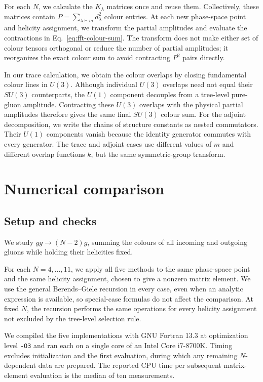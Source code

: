 \documentclass[aps,prd,twocolumn,superscriptaddress,nofootinbib]{revtex4-2}
\begin{document}
For each $N$, we calculate the $K_\lambda$ matrices once and reuse them.
Collectively, these matrices contain
$P=\sum_{\lambda\vdash m}d_\lambda^2$ colour entries.  At each new phase-space
point and helicity assignment, we transform the partial amplitudes and
evaluate the contractions in Eq.~\eqref{eq:fft-colour-sum}.  The transform
does not make either set of colour tensors orthogonal or reduce the number of
partial amplitudes; it reorganizes the exact colour sum to avoid contracting
$P^2$ pairs directly.

In our trace calculation, we obtain the colour overlaps by closing fundamental
colour lines in $U(3)$.  Although individual $U(3)$ overlaps need not equal
their $SU(3)$ counterparts, the $U(1)$ component decouples from a tree-level
pure-gluon amplitude.  Contracting these $U(3)$ overlaps with the physical
partial amplitudes therefore gives the same final $SU(3)$ colour sum.  For the
adjoint decomposition, we write the chains of structure constants as nested
commutators.  Their $U(1)$ components vanish because the identity generator
commutes with every generator.  The trace and adjoint cases use different
values of $m$ and different overlap functions $k$, but the same
symmetric-group transform.

\section{Numerical comparison}
\label{sec:results}



\subsection{Setup and checks}

We study $gg\to(N-2)g$, summing the colours of all incoming and outgoing
gluons while holding their helicities fixed.

For each $N=4,\ldots,11$, we apply all five methods to the same phase-space
point and the same helicity assignment, chosen to give a nonzero matrix
element.  We use the general Berends--Giele recursion in every case, even when
an analytic expression is available, so special-case formulas do not affect
the comparison.  At fixed $N$, the recursion performs the same operations for
every helicity assignment not excluded by the tree-level selection rule.

We compiled the five implementations with GNU Fortran 13.3 at optimization
level \texttt{-O3} and ran each on a single core of an Intel Core i7-8700K.
Timing excludes initialization and the first evaluation, during which any
remaining $N$-dependent data are prepared.  The reported CPU time per
subsequent matrix-element evaluation is the median of ten measurements.
\end{document}
